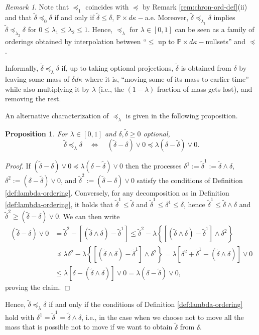 \documentclass[11pt, oneside]{article}   	%
\theoremstyle{plain}
\newtheorem{prop}[thm]{Proposition}
\theoremstyle{definition}
\theoremstyle{remark}
\newtheorem{rem}[thm]{Remark}
\begin{document}
\begin{rem}
Note that $\preceq_1$ coincides with $\preceq$  by Remark \ref{rem:chron-ord-def}(ii) and that $\tilde\delta\preceq_0\delta$ if and only if $\tilde\delta\leq\delta$, $\mathbb{P}\times d\kappa-$a.e. Moreover, $\tilde\delta\preceq_{\lambda_1}\delta$ implies $\tilde\delta\preceq_{\lambda_2}\delta$ for $0\leq\lambda_1\leq\lambda_2\leq 1$. Hence, $\preceq_\lambda$ for $\lambda\in[0,1]$ can be seen as a family of orderings obtained by interpolation between ``$\leq$ up to $\mathbb{P}\times d\kappa-$nullsets'' and $\preceq$.
\end{rem}
Informally, $\tilde\delta\preceq_\lambda\delta$ if, up to taking optional projections, $\tilde\delta$ is obtained from $\delta$ by leaving some mass of $\delta d\kappa$ where it is, ``moving some of its mass to earlier time'' while also multiplying it by $\lambda$ (i.e., the $(1-\lambda)$ fraction of mass gets lost), and removing the rest.

An alternative characterization of $\preceq_\lambda$ is given in the following proposition.
\begin{prop}\label{prop:lambda-ord-alternative}
For $\lambda\in[0,1]$ and $\delta,\tilde\delta\geq 0$ optional,
$$\tilde\delta\preceq_\lambda\delta\quad \Leftrightarrow \quad (\tilde\delta-\delta)\vee 0\preceq \lambda(\delta-\tilde\delta)\vee 0.$$
\end{prop}
\begin{proof}
If $(\tilde\delta-\delta)\vee 0\preceq \lambda(\delta-\tilde\delta)\vee 0$ then the processes $\delta^1:=\tilde\delta^1:=\tilde\delta\wedge\delta$, $\delta^2:=(\delta-\tilde\delta)\vee 0$, and $\tilde\delta^2:=(\tilde\delta-\delta)\vee 0$ satisfy the conditions of Definition \ref{def:lambda-ordering}. Conversely, for any decomposition as in Definition \ref{def:lambda-ordering}, it holds that $\tilde\delta^1\leq \tilde\delta$ and $\tilde\delta^1\leq\delta^1\leq\delta$, hence $\tilde\delta^1\leq \tilde\delta\wedge\delta$ and $\tilde\delta^2\geq (\tilde\delta-\delta)\vee 0$. We can then write
\begin{equation*}
\begin{aligned}
(\tilde\delta-\delta)\vee 0&=\tilde\delta^2-\left[(\tilde\delta\wedge\delta)-\tilde\delta^1\right]\leq \tilde\delta^2- \lambda\left\{\left[(\tilde\delta\wedge\delta)-\tilde\delta^1\right]\wedge \delta^2\right\}\\
&\preceq \lambda\delta^2- \lambda\left\{\left[(\tilde\delta\wedge\delta)-\tilde\delta^1\right]\wedge \delta^2\right\}=\lambda\left[\delta^2+\tilde\delta^1-(\tilde\delta\wedge\delta)\right]\vee 0\\
&\leq \lambda\left[\delta-(\tilde\delta\wedge\delta)\right]\vee 0=\lambda(\delta-\tilde\delta)\vee 0,
\end{aligned}
\end{equation*}
proving the claim.
\end{proof}
Hence, $\tilde\delta\preceq_\lambda\delta$ if and only if the conditions of Definition \ref{def:lambda-ordering} hold with $\delta^1=\tilde\delta^1=\tilde\delta\wedge\delta$, i.e., in the case when we choose not to move all the mass that is possible not to move if we want to obtain $\tilde\delta$ from $\delta$.
\end{document}
